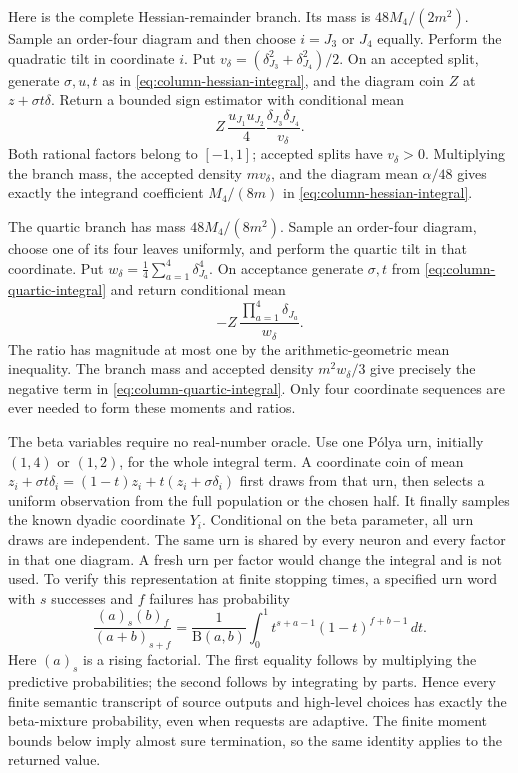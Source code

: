 Here is the complete Hessian-remainder branch.  Its mass is
$48M_4/(2m^2)$.  Sample an order-four diagram and then choose
$i=J_3$ or $J_4$ equally.  Perform the quadratic tilt in coordinate
$i$.  Put $v_\delta=(\delta_{J_3}^2+\delta_{J_4}^2)/2$.
On an accepted split, generate $\sigma,u,t$ as in
\eqref{eq:column-hessian-integral}, and the diagram coin $Z$ at
$z+\sigma t\delta$.  Return a bounded sign estimator with conditional
mean
\[
 Z\,\frac{u_{J_1}u_{J_2}}4
      \frac{\delta_{J_3}\delta_{J_4}}{v_\delta}.
\]
Both rational factors belong to $[-1,1]$; accepted splits have
$v_\delta>0$.  Multiplying the branch mass, the accepted density
$mv_\delta$, and the diagram mean $\alpha/48$ gives exactly the
integrand coefficient $M_4/(8m)$ in
\eqref{eq:column-hessian-integral}.

The quartic branch has mass $48M_4/(8m^2)$.  Sample an order-four
diagram, choose one of its four leaves uniformly, and perform the
quartic tilt in that coordinate.  Put
$w_\delta=\frac14\sum_{a=1}^4\delta_{J_a}^4$.
On acceptance generate $\sigma,t$ from
\eqref{eq:column-quartic-integral} and return conditional mean
\[
 -Z\,\frac{\prod_{a=1}^4\delta_{J_a}}{w_\delta}.
\]
The ratio has magnitude at most one by the arithmetic-geometric mean
inequality.  The branch mass and accepted density
$m^2w_\delta/3$ give precisely the negative term in
\eqref{eq:column-quartic-integral}.  Only four coordinate sequences
are ever needed to form these moments and ratios.

The beta variables require no real-number oracle.  Use one P\'olya
urn, initially $(1,4)$ or $(1,2)$, for the whole integral term.  A
coordinate coin of mean
$z_i+\sigma t\delta_i=(1-t)z_i+t(z_i+\sigma\delta_i)$ first draws
from that urn, then selects a uniform observation from the full
population or the chosen half.  It finally samples the known dyadic
coordinate $Y_i$.  Conditional on the beta parameter, all urn draws
are independent.  The same urn is shared by every neuron and every
factor in that one diagram.  A fresh urn per factor would change the
integral and is not used. To verify this representation at finite
stopping times, a specified urn word with $s$ successes and $f$
failures has probability
\[
 \frac{(a)_s(b)_f}{(a+b)_{s+f}}
 =\frac{1}{\mathrm B(a,b)}\int_0^1
       t^{s+a-1}(1-t)^{f+b-1}\,dt.
\]
Here $(a)_s$ is a rising factorial. The first equality follows by
multiplying the predictive probabilities; the second follows by
integrating by parts. Hence every finite semantic transcript of source
outputs and high-level choices has exactly the beta-mixture probability,
even when requests are adaptive. The
finite moment bounds below imply almost sure termination, so the
same identity applies to the returned value.

